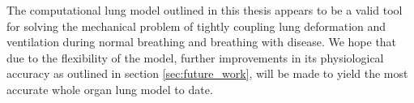 




The computational lung model outlined in this thesis appears to be a valid tool for solving the mechanical problem of tightly coupling lung deformation and ventilation during normal breathing and breathing with disease. 
%
%
We hope that due to the flexibility of the model, further improvements in its physiological accuracy as outlined in section \ref{sec:future_work}, will be made to yield the most accurate whole organ lung model to date.

\begin{comment}
\section{Key findings}
The first part of our work developed a novel method to

Hdiv error

Reliable/stable

The second part of this thesis provided an invaluable stepping stone

Discontiinous pressure elements are good.





Finally, the third part of our thesis shows

Coupling effects are important

Parameters in Lung model are very important, at the moment unkown.
\end{comment}




